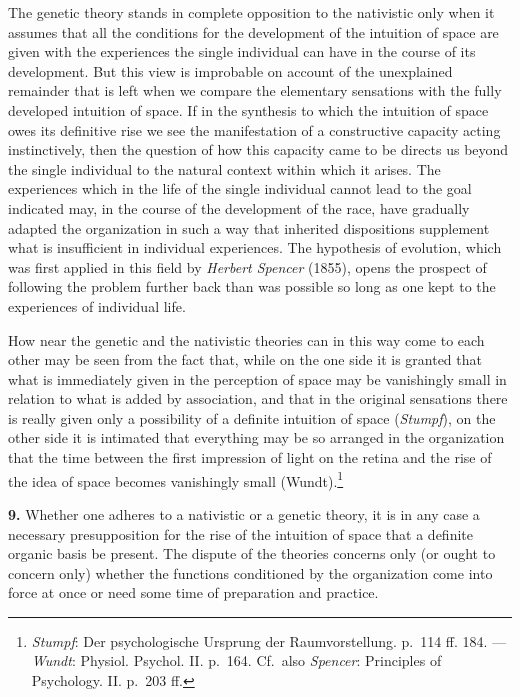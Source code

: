 \documentclass[12pt,a4paper]{book}
\newcommand{\opage}[1]{\marginnote{\footnotesize\textit{[#1]}}}
\begin{document}
The genetic theory stands in complete opposition to the nativistic only
when it assumes that all the conditions for the development of the
intuition of space are given with the experiences the single individual
can have in the course of its development. But this view is improbable
on account of the unexplained remainder that is left when we compare the
elementary sensations with the fully developed intuition of space. If in
the synthesis to which the intuition of space owes its definitive rise we
see the manifestation of a constructive capacity acting instinctively,
then the question of how this capacity came to be directs us beyond the
single individual to the natural context within which it arises. The
experiences
\opage{249}which in the life of the single individual cannot lead to the
goal indicated may, in the course of the development of the race, have
gradually adapted the organization in such a way that inherited
dispositions supplement what is insufficient in individual experiences.
The hypothesis of evolution, which was first applied in this field by
\emph{Herbert Spencer} (1855), opens the prospect of following the
problem further back than was possible so long as one kept to the
experiences of individual life.

How near the genetic and the nativistic theories can in this way come to
each other may be seen from the fact that, while on the one side it is
granted that what is immediately given in the perception of space may be
vanishingly small in relation to what is added by association, and that
in the original sensations there is really given only a possibility of a
definite intuition of space (\emph{Stumpf}), on the other side it is
intimated that everything may be so arranged in the organization that
the time between the first impression of light on the retina and the
rise of the idea of space becomes vanishingly small
(Wundt).\footnote{\emph{Stumpf}: Der psychologische Ursprung der
Raumvorstellung. p.~114 ff. 184. --- \emph{Wundt}: Physiol. Psychol. II.
p.~164. Cf.\ also \emph{Spencer}: Principles of Psychology. II. p.~203
ff.}

\textbf{9.} Whether one adheres to a nativistic or a genetic theory, it
is in any case a necessary presupposition for the rise of the intuition
of space that a definite organic basis be present. The dispute of the
theories concerns only (or ought to concern only) whether the functions
conditioned by the organization come into force at once or need some
time of preparation and practice.
\end{document}
